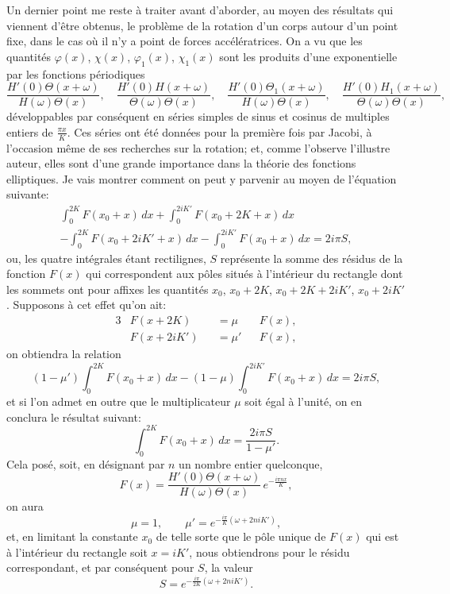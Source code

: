 \documentclass[11pt,leqno,oneside,letterpaper]{book}[2005/09/16]
\begin{document}
Un dernier point me reste \`a traiter avant d'aborder, au moyen des
r\'esultats qui viennent d'\^etre obtenus, le probl\`eme de la rotation d'un
corps autour d'un point fixe, dans le cas o\`u il n'y a point de forces acc\'el\'eratrices.
On a vu que les quantit\'es $\varphi (x)$, $\chi (x)$, $\varphi_1 (x)$, $\chi_1 (x)$ sont les
produits d'une exponentielle par les fonctions p\'eriodiques
\[
\frac{H'(0) \Theta  (x + \omega)}{H      (\omega) \Theta (x)},\quad
\frac{H'(0) H       (x + \omega)}{\Theta (\omega) \Theta (x)},\quad
\frac{H'(0) \Theta_1(x + \omega)}{H      (\omega) \Theta (x)},\quad
\frac{H'(0) H_1     (x + \omega)}{\Theta (\omega) \Theta (x)},
\]
d\'eveloppables par cons\'equent en s\'eries simples de sinus et cosinus de
multiples entiers de $\frac{\pi x}{K}$. Ces s\'eries ont \'et\'e donn\'ees pour la premi\`ere fois
par Jacobi, \`a l'occasion m\^eme de ses recherches sur la rotation; et, comme
l'observe l'illustre auteur, elles sont d'une grande importance dans la
th\'eorie des fonctions elliptiques. Je vais montrer comment on peut y parvenir
au moyen de l'\'equation suivante:
\begin{multline*}
\int_0^{2K} F(x_0+x)\, dx + \int_0^{2iK'} F(x_0+2K+x)\, dx \\
-\int_0^{2K} F(x_0+2iK'+x)\, dx - \int_0^{2iK'} F(x_0+x)\, dx
=2i\pi S,
\end{multline*}
ou, les quatre int\'egrales \'etant rectilignes, $S$ repr\'esente la somme des r\'esidus
de la fonction $F(x)$ qui correspondent aux p\^oles situ\'es \`a l'int\'erieur du
rectangle dont les sommets ont pour affixes les quantit\'es $x_0$, $x_0+2K$,
$x_0+2K+2iK'$, $x_0+2iK'$. Supposons \`a cet effet qu'on ait:
\begin{alignat*}{3}
&F(x+ 2K) &&= \mu &&F(x),\\
&F(x + 2iK') &&= \mu' &&F(x),
\end{alignat*}
on obtiendra la relation
\[
(1-\mu') \int_0^{2K} F(x_0+x)\, dx -
(1-\mu) \int_0^{2iK'}F(x_0+x)\, dx = 2i\pi S,
\]
et si l'on admet en outre que le multiplicateur $\mu$ soit \'egal \`a l'unit\'e, on en
conclura le r\'esultat suivant:
\[
\int_0^{2K} F(x_0+x)\, dx = \frac{2i\pi S}{1-\mu'}.
\]
Cela pos\'e, soit, en d\'esignant par $n$ un nombre entier quelconque,
\[
F(x)= \frac{H'(0)\Theta(x+\omega)}{H(\omega)\Theta(x)}\,
e^{-\frac{i\pi n x}{K}} ,
\]
on aura
\[
\mu=1, \qquad
\mu' = e^{-\frac{i\pi}{K}(\omega+2niK')},
\]
et, en limitant la constante $x_0$ de telle sorte que le p\^ole unique de $F(x)$ qui
est \`a l'int\'erieur du rectangle soit $x=iK'$, nous obtiendrons pour le r\'esidu
correspondant, et par cons\'equent pour $S$, la valeur
\[
S= e^{-\frac{i\pi}{2K}(\omega+2niK')}.
\]
\end{document}
